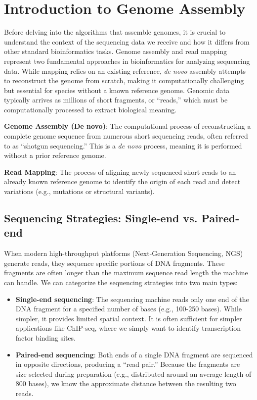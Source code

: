
\section{Introduction to Genome Assembly}

Before delving into the algorithms that assemble genomes, it is crucial to understand the context of the sequencing data we receive and how it differs from other standard bioinformatics tasks. Genome assembly and read mapping represent two fundamental approaches in bioinformatics for analyzing sequencing data. While mapping relies on an existing reference, \textit{de novo} assembly attempts to reconstruct the genome from scratch, making it computationally challenging but essential for species without a known reference genome. Genomic data typically arrives as millions of short fragments, or ``reads,'' which must be computationally processed to extract biological meaning.

\begin{important}
    \textbf{Genome Assembly (De novo)}: The computational process of reconstructing a complete genome sequence from numerous short sequencing reads, often referred to as ``shotgun sequencing.'' This is a \textit{de novo} process, meaning it is performed without a prior reference genome.
\end{important}

\begin{important}
    \textbf{Read Mapping}: The process of aligning newly sequenced short reads to an already known reference genome to identify the origin of each read and detect variations (e.g., mutations or structural variants).
\end{important}

\subsection{Sequencing Strategies: Single-end vs. Paired-end}
When modern high-throughput platforms (Next-Generation Sequencing, NGS) generate reads, they sequence specific portions of DNA fragments. These fragments are often longer than the maximum sequence read length the machine can handle. We can categorize the sequencing strategies into two main types:

\begin{itemize}
    \item \textbf{Single-end sequencing}: The sequencing machine reads only one end of the DNA fragment for a specified number of bases (e.g., 100-250 bases). While simpler, it provides limited spatial context. It is often sufficient for simpler applications like ChIP-seq, where we simply want to identify transcription factor binding sites.
    \item \textbf{Paired-end sequencing}: Both ends of a single DNA fragment are sequenced in opposite directions, producing a ``read pair.'' Because the fragments are size-selected during preparation (e.g., distributed around an average length of 800 bases), we know the approximate distance between the resulting two reads.
\end{itemize}

